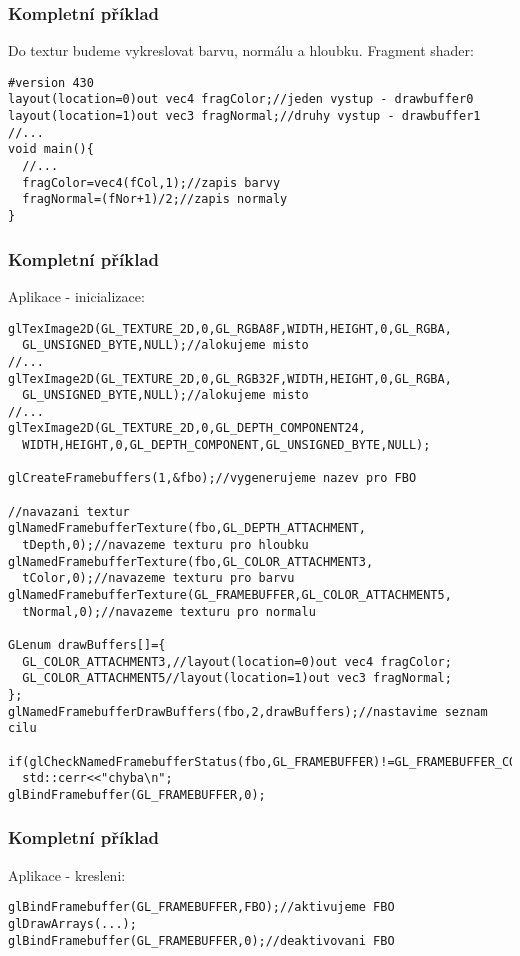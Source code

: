 \begin{frame}[fragile]
\frametitle{Kompletní příklad}
    Do textur budeme vykreslovat barvu, normálu a hloubku.
    Fragment shader:
{\scriptsize
\begin{verbatim}
#version 430
layout(location=0)out vec4 fragColor;//jeden vystup - drawbuffer0
layout(location=1)out vec3 fragNormal;//druhy vystup - drawbuffer1
//...
void main(){
  //...
  fragColor=vec4(fCol,1);//zapis barvy
  fragNormal=(fNor+1)/2;//zapis normaly
}
\end{verbatim}
}
\end{frame}

\begin{frame}[fragile]
\frametitle{Kompletní příklad}
    Aplikace - inicializace:
    {\tiny
\begin{verbatim}
glTexImage2D(GL_TEXTURE_2D,0,GL_RGBA8F,WIDTH,HEIGHT,0,GL_RGBA,
  GL_UNSIGNED_BYTE,NULL);//alokujeme misto
//...
glTexImage2D(GL_TEXTURE_2D,0,GL_RGB32F,WIDTH,HEIGHT,0,GL_RGBA,
  GL_UNSIGNED_BYTE,NULL);//alokujeme misto
//...
glTexImage2D(GL_TEXTURE_2D,0,GL_DEPTH_COMPONENT24,
  WIDTH,HEIGHT,0,GL_DEPTH_COMPONENT,GL_UNSIGNED_BYTE,NULL);

glCreateFramebuffers(1,&fbo);//vygenerujeme nazev pro FBO

//navazani textur
glNamedFramebufferTexture(fbo,GL_DEPTH_ATTACHMENT,
  tDepth,0);//navazeme texturu pro hloubku
glNamedFramebufferTexture(fbo,GL_COLOR_ATTACHMENT3,
  tColor,0);//navazeme texturu pro barvu
glNamedFramebufferTexture(GL_FRAMEBUFFER,GL_COLOR_ATTACHMENT5,
  tNormal,0);//navazeme texturu pro normalu

GLenum drawBuffers[]={
  GL_COLOR_ATTACHMENT3,//layout(location=0)out vec4 fragColor;
  GL_COLOR_ATTACHMENT5//layout(location=1)out vec3 fragNormal;
};
glNamedFramebufferDrawBuffers(fbo,2,drawBuffers);//nastavime seznam cilu

if(glCheckNamedFramebufferStatus(fbo,GL_FRAMEBUFFER)!=GL_FRAMEBUFFER_COMPLETE)
  std::cerr<<"chyba\n";
glBindFramebuffer(GL_FRAMEBUFFER,0);
    \end{verbatim}
    }
\end{frame}

\begin{frame}[fragile]
\frametitle{Kompletní příklad}
    Aplikace - kresleni:
{\scriptsize
\begin{verbatim}
glBindFramebuffer(GL_FRAMEBUFFER,FBO);//aktivujeme FBO
glDrawArrays(...);
glBindFramebuffer(GL_FRAMEBUFFER,0);//deaktivovani FBO
\end{verbatim}
}
\end{frame}

